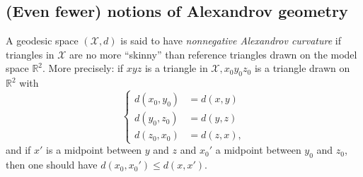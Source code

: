 \subsection{(Even fewer) notions of Alexandrov geometry}
\label{sec:alexandrov}
\begin{defi}
    A geodesic space $(\mathcal{X}, d)$ is said to have \emph{nonnegative Alexandrov curvature} if triangles in $\mathcal{X}$ are no more ``skinny'' than reference triangles drawn on the model space $\mathbb{R}^2$. More precisely: if $x y z$ is a triangle in $\mathcal{X}, x_0 y_0 z_0$ is a triangle drawn on $\mathbb{R}^2$ with
    $$\left\{\begin{aligned}
        d(x_0,y_0)&=d(x,y)\\
        d(y_0,z_0)&=d(y,z)\\
        d(z_0,x_0)&=d(z,x),
    \end{aligned}\right.$$
    and if $x'$ is a midpoint between $y$ and $z$ and $x_0'$ a midpoint between $y_0$ and $z_0$, then one should have $d(x_0, x_0') \leq d(x, x')$.
\end{defi}

